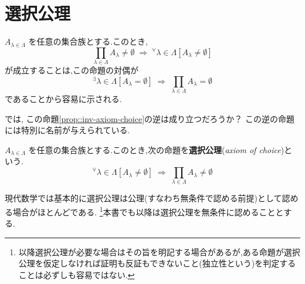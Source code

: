 \section{選択公理}

$A_{\lambda\in\Lambda}$ を任意の集合族とする.このとき,
\begin{equation}
    \prod_{\lambda\in\Lambda}A_\lambda\neq\emptyset\;\Longrightarrow\;{}^\forall{\lambda\in\Lambda}\left[A_\lambda\neq\emptyset\right]
    \label{prop::inv-axiom-choice}
\end{equation}
が成立することは,この命題の対偶が
$${}^\exists{\lambda\in\Lambda}\left[A_\lambda=\emptyset\right]\;\Longrightarrow\;\prod_{\lambda\in\Lambda}A_\lambda=\emptyset$$
であることから容易に示される.

では, この命題\ref{prop::inv-axiom-choice}の逆は成り立つだろうか？
この逆の命題には特別に名前が与えられている.

\begin{framed}
    \begin{dfn}[選択公理]
        $A_{\lambda\in\Lambda}$ を任意の集合族とする.このとき,次の命題を\textbf{選択公理}(\textit{axiom of choice})という.
        \begin{equation}
            {}^\forall{\lambda\in\Lambda}\left[A_\lambda\neq\emptyset\right]\;\Longrightarrow\;\prod_{\lambda\in\Lambda}A_\lambda\neq\emptyset\label{dfn::axiom-choice}
        \end{equation}
    \end{dfn}
\end{framed}

現代数学では基本的に選択公理は公理(すなわち無条件で認める前提)として認める場合がほとんどである.
\footnote{
    以降選択公理が必要な場合はその旨を明記する場合があるが,ある命題が選択公理を仮定しなければ証明も反証もできないこと(独立性という)を判定することは必ずしも容易ではない.
}本書でも以降は選択公理を無条件に認めることとする.
